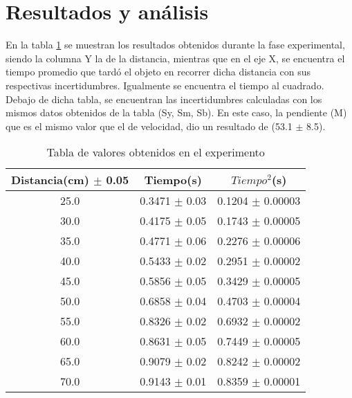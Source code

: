 \documentclass{article}
\begin{document}
\section{Resultados y análisis}\label{Resultados}			%
En la tabla \ref{table:1} se muestran los resultados obtenidos durante la fase experimental, siendo la columna Y la de la distancia, mientras que en el eje X, se encuentra el tiempo promedio que tardó el objeto en recorrer dicha distancia con sus respectivas incertidumbres. Igualmente se encuentra el tiempo al cuadrado. Debajo de dicha tabla, se encuentran las incertidumbres calculadas con los mismos datos obtenidos de la tabla (Sy, Sm, Sb). En este caso, la pendiente (M) que es el mismo valor que el de velocidad, dio un resultado de (53.1 $\pm$ 8.5). 

\begin{table}[H]
	\centering
	\begin{tabular}{|c|c|c|}
		\hline
		Distancia(cm) $\pm$ 0.05 & Tiempo(s) & $Tiempo^2$(s) \\
		\hline
		25.0 & 0.3471 $\pm$ 0.03 & 0.1204 $\pm$ 0.00003 \\
		\hline
		30.0 & 0.4175 $\pm$ 0.05 & 0.1743 $\pm$ 0.00005 \\
		\hline
		35.0 & 0.4771 $\pm$ 0.06 & 0.2276 $\pm$ 0.00006 \\
		\hline
		40.0 & 0.5433 $\pm$ 0.02 & 0.2951 $\pm$ 0.00002 \\
		\hline
		45.0 & 0.5856 $\pm$ 0.05 & 0.3429 $\pm$ 0.00005 \\
		\hline
		50.0 & 0.6858 $\pm$ 0.04 & 0.4703 $\pm$ 0.00004 \\
		\hline
		55.0 & 0.8326 $\pm$ 0.02 & 0.6932 $\pm$ 0.00002 \\
		\hline
		60.0 & 0.8631 $\pm$ 0.05 & 0.7449 $\pm$ 0.00005 \\
		\hline
		65.0 & 0.9079 $\pm$ 0.02 & 0.8242 $\pm$ 0.00002 \\
		\hline
		70.0 & 0.9143 $\pm$ 0.01 & 0.8359 $\pm$ 0.00001 \\
		\hline
	\end{tabular}
	\caption{Tabla de valores obtenidos en el experimento}
	\label{table:1}
\end{table}
\end{document}
